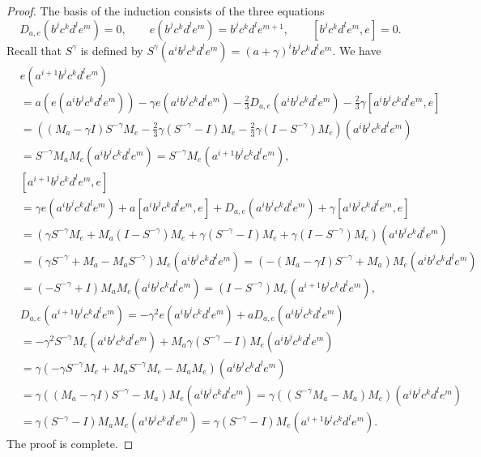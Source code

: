 \documentclass{amsart}
\theoremstyle{plain}
\theoremstyle{definition}
\begin{document}
\begin{proof}
The basis of the induction consists of the three equations
  \[
  D_{a,e}( b^j c^k d^l e^m ) = 0,
  \qquad
  e ( b^j c^k d^l e^m ) = b^j c^k d^l e^{m+1},
  \qquad
  [ b^j c^k d^l e^m, e ] = 0.
  \]
Recall that $S^\gamma$ is defined by $S^\gamma( a^i b^j c^k d^l e^m ) = ( a +
\gamma )^i b^j c^k d^l e^m$. We have
  \allowdisplaybreaks
  \begin{align*}
  &
  e (a^{i+1} b^j c^k d^l e^m)
  \\
  &=
  a ( e (a^i b^j c^k d^l e^m) )
  -
  \gamma
  e ( a^i b^j c^k d^l e^m )
  -
  \tfrac23
  D_{a,e} ( a^i b^j c^k d^l e^m )
  -
  \tfrac23 \gamma
  [ a^i b^j c^k d^l e^m, e ]
  \\
  &=
  (
  ( M_a - \gamma I ) S^{-\gamma} M_e
  -
  \tfrac23 \gamma
  ( S^{-\gamma} - I ) M_e
  -
  \tfrac23 \gamma
  ( I - S^{-\gamma} ) M_e
  )
  ( a^i b^j c^k d^l e^m )
  \\
  &=
  S^{-\gamma} M_a M_e (a^i b^j c^k d^l e^m)
  =
  S^{-\gamma} M_e (a^{i+1} b^j c^k d^l e^m),
  \\
  &
  [a^{i+1} b^j c^k d^l e^m, e]
  \\
  &=
  \gamma e(a^i b^j c^k d^l e^m)
  +
  a [ a^i b^j c^k d^l e^m, e ]
  +
  D_{a,e} ( a^i b^j c^k d^l e^m )
  +
  \gamma
  [ a^i b^j c^k d^l e^m, e ]
  \\
  &=
  (
  \gamma
  S^{-\gamma} M_e
  +
  M_a ( I {-} S^{-\gamma} ) M_e
  +
  \gamma
  ( S^{-\gamma} {-} I ) M_e
  +
  \gamma
  ( I {-} S^{-\gamma} ) M_e
  )
  ( a^i b^j c^k d^l e^m )
  \\
  &=
  ( \gamma S^{-\gamma} {+} M_a {-} M_a S^{-\gamma} ) M_e
  (a^i b^j c^k d^l e^m)
  =
  ( - ( M_a {-} \gamma I ) S^{-\gamma} {+} M_a ) M_e
  ( a^i b^j c^k d^l e^m )
  \\
  &=
  ( - S^{-\gamma} + I ) M_a M_e
  ( a^i b^j c^k d^l e^m )
  =
  ( I - S^{-\gamma} ) M_e
  ( a^{i+1} b^j c^k d^l e^m ),
  \\
  &
  D_{a,e} ( a^{i+1} b^j c^k d^l e^m )
  =
  -
  \gamma^2 e ( a^i b^j c^k d^l e^m )
  +
  a D_{a,e} ( a^i b^j c^k d^l e^m )
  \\
  &=
  -\gamma^2 S^{-\gamma}
  M_e ( a^i b^j c^k d^l e^m )
  +
  M_a \gamma ( S^{-\gamma} - I ) M_e
  ( a^i b^j c^k d^l e^m )
  \\
  &=
  \gamma
  ( - \gamma S^{-\gamma} M_e + M_a S^{-\gamma} M_e - M_a M_e )
  ( a^i b^j c^k d^l e^m )
  \\
  &=
  \gamma
  ( ( M_a - \gamma I ) S^{-\gamma} - M_a ) M_e
  ( a^i b^j c^k d^l e^m )
  =
  \gamma
  ( ( S^{-\gamma} M_a - M_a ) M_e )
  ( a^i b^j c^k d^l e^m )
  \\
  &=
  \gamma
  ( S^{-\gamma} - I) M_a M_e
  ( a^i b^j c^k d^l e^m )
  =
  \gamma
  ( S^{-\gamma} - I) M_e
  ( a^{i+1} b^j c^k d^l e^m ).
  \end{align*}
The proof is complete.
\end{proof}
\end{document}
